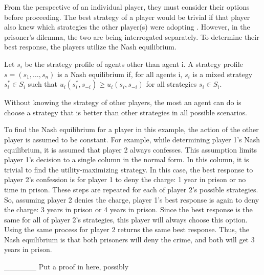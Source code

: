 From the perspective of an individual player, they must consider their options before proceeding. The best strategy of a player would be trivial if that player also knew which strategies the other player(s) were adopting \cite{shoh09}. However, in the prisoner's dilemma, the two are being interrogated separately. To determine their best response, the players utilize the Nash equilibrium.

\begin{define}
  Let $s_i$ be the strategy profile of agents other than agent i. A strategy profile $s=(s_1,\dots ,s_n)$ is a Nash equilibrium if, for all agents i, $s_i$ is a mixed strategy $s^*_i\in S_i$ such that $u_i(s^*_i, s_{-i}) \ge u_i(s_i, s_{-i})$ for all strategies $s_i\in S_i$.
\end{define}

Without knowing the strategy of other players, the most an agent can do is choose a strategy that is better than other strategies in all possible scenarios. 

To find the Nash equilibrium for a player in this example, the action of the other player is assumed to be constant. For example, while determining player 1's Nash equilibrium, it is assumed that player 2 always confesses. This assumption limits player 1's decision to a single column in the normal form. In this column, it is trivial to find the utility-maximizing strategy. In this case, the best response to player 2's confession is for player 1 to deny the charge: 1 year in prison or no time in prison. These steps are repeated for each of player 2's possible strategies. So, assuming player 2 denies the charge, player 1's best response is again to deny the charge: 3 years in prison or 4 years in prison. Since the best response is the same for all of player 2's strategies, this player will always choose this option. Using the same process for player 2 returns the same best response. Thus, the Nash equilibrium is that both prisoners will deny the crime, and both will get 3 years in prison.

\_\_\_\_\_\_ Put a proof in here, possibly

